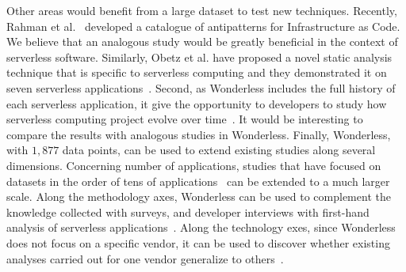 %
Other areas would benefit from a large dataset to test new techniques.
Recently, Rahman et al.~\cite{DBLP:journals/ese/RahmanFW20} developed a 
catalogue of antipatterns for Infrastructure as Code. We believe that an analogous 
study would be greatly beneficial in the context of serverless software.
Similarly, Obetz et al. have proposed a novel static analysis technique that is  
specific to serverless computing and they demonstrated it on 
seven serverless applications~\cite{10.5555/3357034.3357059}.
%
Second, as Wonderless includes the full history of each serverless application, 
it give the opportunity to developers to study how serverless computing 
project evolve over time~\cite{sousa2020characterizing, du2020understanding, wen2020empirical}. 
It would be interesting to compare the results with analogous studies in Wonderless.
%
Finally, Wonderless, with $1,877$ data points, can be used to extend existing 
studies along several dimensions. Concerning number of applications,
studies that have focused on datasets in the order of tens of 
applications~\cite{eismann2020serverless} can be extended to a much larger scale.
Along the methodology axes, Wonderless can be used to complement the knowledge collected 
with surveys, and developer interviews with first-hand analysis of
serverless applications~\cite{leitner2019mixed}.
Along the technology exes, since Wonderless does not focus on a specific vendor, it can be used
to discover whether existing analyses carried out for one vendor
generalize to others~\cite{spillner2019quantitative}.











